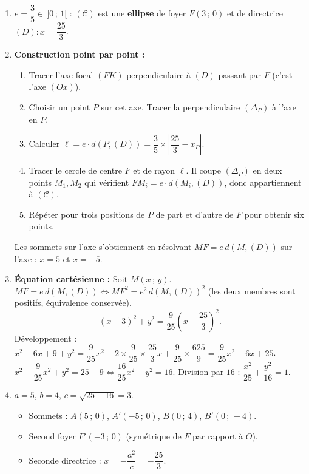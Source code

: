 \documentclass[11pt]{article}
\begin{document}
\begin{corrige}
\begin{enumerate}
\item $e = \dfrac{3}{5} \in\,]0\,;\,1[$ : $(\mathcal{C})$ est une \textbf{ellipse} de foyer $F(3\,;\,0)$ et de directrice $(D) : x = \dfrac{25}{3}$.
\item \textbf{Construction point par point :}
  \begin{enumerate}
    \item Tracer l'axe focal $(FK)$ perpendiculaire à $(D)$ passant par $F$ (c'est l'axe $(Ox)$).
    \item Choisir un point $P$ sur cet axe. Tracer la perpendiculaire $(\Delta_{P})$ à l'axe en $P$.
    \item Calculer $\ell = e \cdot d(P, (D)) = \dfrac{3}{5} \times \left|\dfrac{25}{3} - x_{P}\right|$.
    \item Tracer le cercle de centre $F$ et de rayon $\ell$. Il coupe $(\Delta_{P})$ en deux points $M_{1}, M_{2}$ qui vérifient $FM_{i} = e \cdot d(M_{i}, (D))$, donc appartiennent à $(\mathcal{C})$.
    \item Répéter pour trois positions de $P$ de part et d'autre de $F$ pour obtenir six points.
  \end{enumerate}
  Les sommets sur l'axe s'obtiennent en résolvant $MF = e\,d(M,(D))$ sur l'axe : $x = 5$ et $x = -5$.
\item \textbf{Équation cartésienne :} Soit $M(x\,;\,y)$.
  $MF = e\,d(M,(D)) \iff MF^{2} = e^{2}\,d(M,(D))^{2}$ (les deux membres sont positifs, équivalence conservée).
  \[ (x-3)^{2} + y^{2} = \dfrac{9}{25}\left(x - \dfrac{25}{3}\right)^{2}. \]
  Développement : $x^{2} - 6x + 9 + y^{2} = \dfrac{9}{25}x^{2} - 2 \times \dfrac{9}{25} \times \dfrac{25}{3}x + \dfrac{9}{25} \times \dfrac{625}{9} = \dfrac{9}{25}x^{2} - 6x + 25$.
  $x^{2} - \dfrac{9}{25}x^{2} + y^{2} = 25 - 9 \iff \dfrac{16}{25}x^{2} + y^{2} = 16$.
  Division par $16$ : $\dfrac{x^{2}}{25} + \dfrac{y^{2}}{16} = 1$.
\item $a = 5$, $b = 4$, $c = \sqrt{25-16} = 3$.
  \begin{itemize}
    \item Sommets : $A(5\,;\,0)$, $A'(-5\,;\,0)$, $B(0\,;\,4)$, $B'(0\,;\,-4)$.
    \item Second foyer $F'(-3\,;\,0)$ (symétrique de $F$ par rapport à $O$).
    \item Seconde directrice : $x = -\dfrac{a^{2}}{c} = -\dfrac{25}{3}$.
  \end{itemize}

\end{enumerate}
\end{corrige}
\end{document}

